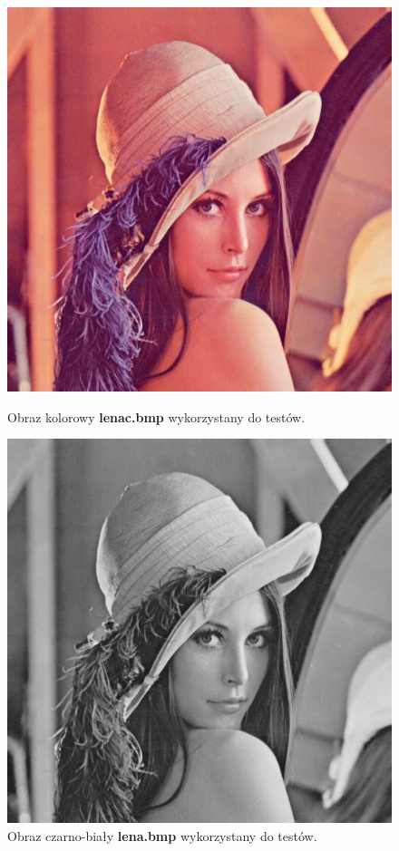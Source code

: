 \documentclass{classrep}
\begin{document}
\begin{figure}
  \begin{minipage}{0.5\linewidth}
    \centering
    \includegraphics[scale=0.4]{img/lenac.png}
    \caption{Obraz kolorowy \textbf{lenac.bmp} wykorzystany do testów.}
    \label{fig.lenac}
  \end{minipage}
  \hspace{0.5cm}
  \begin{minipage}{0.5\linewidth}
    \centering
    \includegraphics[scale=0.4]{img/lena.png}
    \caption{Obraz czarno-biały \textbf{lena.bmp} wykorzystany do testów.}
    \label{fig.lena}
  \end{minipage}
\end{figure}
\end{document}
